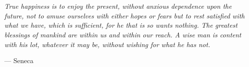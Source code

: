 \documentclass[draft,10pt,twoside,openright,english]{book}
\author{Ewerton Lopes Silva de Oliveira}
\title{\thesistitle}
\begin{document}

\maketitle

\hypersetup{pageanchor=true}

\cleardoublepage
\newpage

\setcounter{page}{1}
\pagestyle{fancy} %

% 





\chapter*{}
\vspace*{\fill}
\renewcommand{\epigraphsize}{\large}
\setlength{\epigraphwidth}{0.5\textwidth}
\epigraph{\itshape True happiness is to enjoy the present, without anxious dependence upon the future, not to amuse ourselves with either hopes or fears but to rest satisfied with what we have, which is sufficient, for he that is so wants nothing. The greatest blessings of mankind are within us and within our reach. A wise man is content with his lot, whatever it may be, without wishing for what he has not.}{--- Seneca}
\cleardoublepage
\end{document}
